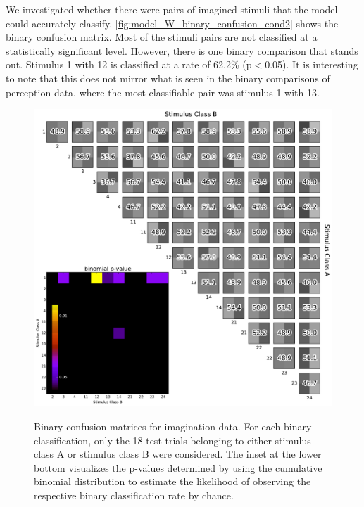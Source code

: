 We investigated whether there were pairs of imagined stimuli that the model could accurately classify. 
\autoref{fig:model_W_binary_confusion_cond2} shows the binary confusion matrix.
Most of the stimuli pairs are not classified at a statistically significant level. 
However, there is one binary comparison that stands out. 
Stimulus 1 with 12 is classified at a rate of 62.2\% (p$<$0.05). 
It is interesting to note that this does not mirror what is seen in the binary comparisons of perception data, where the most classifiable pair was stimulus 1 with 13. 
\begin{figure}[h] 
  \begin{center}
    \includegraphics[width=.75\textwidth,keepaspectratio=true]{Figures/model_W_binary_confusion_cond2}
   \\\vspace{-0.8em}
    \caption{Binary confusion matrices for imagination data.
    For each binary classification, only the 18 test trials belonging to either stimulus class A or stimulus class B were considered.
    The inset at the lower bottom visualizes the p-values determined by using the cumulative binomial distribution to estimate the likelihood of observing the respective binary classification rate by chance.}
    \label{fig:model_W_binary_confusion_cond2}
  \end{center}
  \vspace{-1em}
\end{figure}
\newpage
